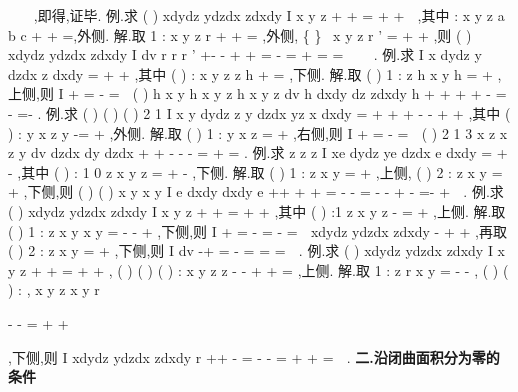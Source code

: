 \int \int 
\int \int 
\int \int 
\rho 
\rho 



,即得,证毕. 
\textcolor{lyred}{例}.求
(
)
xdydz
ydzdx
zdxdy
I
x
y
z
\Sigma 
+
+
=
+
+
\int \int 
,其中
:
x
y
z
a
b
c
\Sigma 
+
+
=,外侧. 
解.取
1 : x
y
z
r
\Sigma 
+
+
=
,外侧,
\{
\}
\ x
y
z
r
'
\Omega =\Omega 
+
+
\le 
,则 
(
)
xdydz
ydzdx
zdxdy
I
dv
r
r
r
\pi 
\pi 
'
\Sigma +-\Sigma 
-\Sigma 
\Omega 
\Sigma 
+
+
=
-
=
\cdots 
+
=
\cdots \cdots 
=
\int \int 
\int \int 
\int \int \int 
\int \int 



. 
\textcolor{lyred}{例}.求
I
x dydz
y dzdx
z dxdy
\Sigma 
=
+
+
\int \int 
,其中
(
)
:
x
y
z
z
h
\Sigma 
+
=
\le 
\le 
,下侧. 
解.取
(
)
1 : z
h x
y
h
\Sigma 
=
+
\le 
,上侧,则
I
\Sigma +\Sigma 
\Sigma 
=
-
=
\int \int 
\int \int 

(
)
h
x
y
h
x
y
z
h
x
y
z dv
h dxdy
dz
zdxdy
h
\pi 
\pi 
\Omega 
+
\le 
+
\le 
+
+
-
=
-
=-
\int \int \int 
\int \int 
\int 
\int \int 
. 
\textcolor{lyred}{例}.求
(
)
(
)
(
)
2 1
I
x
y
dydz
z
y
dzdx
yz
x
dxdy
\Sigma 
=
+
+
+
-
-
+
+
\int \int 
,其中 
(
)
:
y
x
z
y
\Sigma 
-=
+
\le 
\le 
,外侧. 
解.取
(
)
1 :
y
x
z
\Sigma 
=
+
\le 
,右侧,则
I
\Sigma +\Sigma 
\Sigma 
=
-
=
\int \int 
\int \int 

(
)
2 1 3
x
z
x
z
y
dv
dzdx
dy
dzdx
\pi 
\pi 
\Omega 
+
\le 
+
\le -
-
-
=
+
=
\int \int \int 
\int \int 
\int 
\int \int 
. 
\textcolor{lyred}{例}.求
z
z
z
I
xe dydz
ye dzdx
e dxdy
\Sigma 
=
+
-
\int \int 
,其中
(
)
:
1 0
z
x
y
z
\Sigma 
=
+
-
\le 
\le 
,下侧. 
解.取
(
)
1 :
z
x
y
\Sigma 
=
+
\le 
,上侧,
(
)
2 :
z
x
y
\Sigma 
=
+
\le 
,下侧,则 
(
)
(
)
x
y
x
y
I
e dxdy
dxdy
e
\pi 
\pi 
\Sigma +\Sigma +\Sigma 
\Sigma 
\Sigma 
+
\le 
+
\le 
=
-
-
=
-
-
+
-
=-
+
\int \int 
\int \int 
\int \int 
\int \int 
\int \int 

. 
\textcolor{lyred}{例}.求
(
)
xdydz
ydzdx
zdxdy
I
x
y
z
\Sigma 
+
+
=
+
+
\int \int 
,其中
(
)
:1
z
x
y
z
\Sigma 
-
=
+
\ge 
,上侧. 
解.取
(
)
1 :
z
x
y
x
y
\Sigma 
=
-
-
+
\le 
,下侧,则
I
\Sigma +\Sigma 
\Sigma 
\Sigma 
=
-
=
-
=
\int \int 
\int \int 
\int \int 

xdydz
ydzdx
zdxdy
-\Sigma 
+
+
\int \int 
,再取
(
)
2 :
z
x
y
\Sigma 
=
+
\le 
,下侧,则 
I
dv
\pi 
\pi 
-\Sigma +\Sigma 
\Sigma 
\Omega 
=
-
=
=\cdots 
=
\int \int 
\int \int 
\int \int \int 

. 
\textcolor{lyred}{例}.求
(
)
xdydz
ydzdx
zdxdy
I
x
y
z
\Sigma 
+
+
=
+
+
\int \int 
,
(
)
(
)
(
)
:
x
y
z
z
-
-
\Sigma 
+
+
=
\ge 
,上侧. 
解.取
1 : z
r
x
y
\Sigma 
=
-
-
,
(
)
(
)
:
,
x
y
z
x
y
r


-
-
\Sigma 
=
+
\ge 
+
\le 






,下侧,则 
I
xdydz
ydzdx
zdxdy
r
\pi 
\Sigma +\Sigma +\Sigma 
\Sigma 
\Sigma 
-\Sigma 
=
-
-
=
+
+
=
\int \int 
\int \int 
\int \int 
\int \int 

. 
\vspace{4pt}
{\bfseries \textcolor{lyred}{二.沿闭曲面积分为零的条件}}

